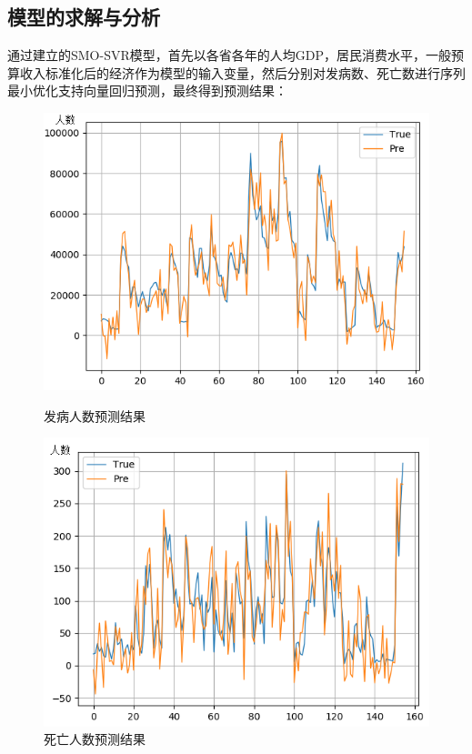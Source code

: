 \documentclass{whutmod}
\begin{document}
     \subsection{模型的求解与分析}
     通过建立的SMO-SVR模型，首先以各省各年的人均GDP，居民消费水平，一般预算收入标准化后的经济作为模型的输入变量，然后分别对发病数、死亡数进行序列最小优化支持向量回归预测，最终得到预测结果：
     
     	\begin{figure}[H]
     	\begin{minipage}[t]{0.5\linewidth}
     	\centering
\includegraphics[width=\textwidth]{figures/Figure_9.png}
\caption{发病人数预测结果}\label{Figure_9}
     	\end{minipage}
     	\hfill%
     	\begin{minipage}[t]{0.5\linewidth}
     	\centering
\includegraphics[width=\textwidth]{figures/Figure_10.png}
\caption{死亡人数预测结果}\label{Figure_10}
     	\end{minipage}
     \end{figure}
     
\end{document}
